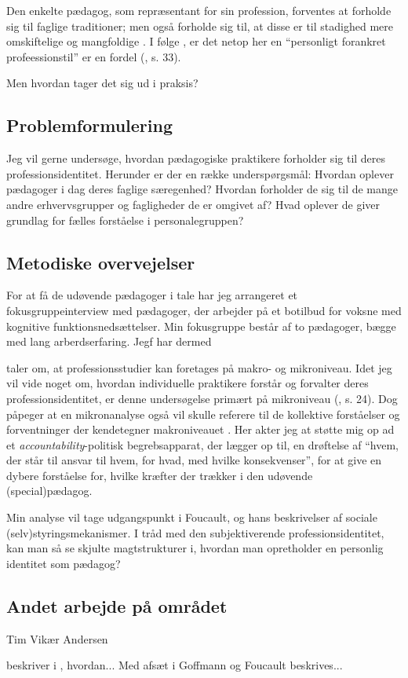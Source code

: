 Den enkelte pædagog, som repræsentant for sin profession, forventes at forholde sig til faglige traditioner; men også forholde sig til, at disse er til stadighed mere omskiftelige og mangfoldige \autocite{hansbolKonstruktionAfProfessionel2008}. I følge \citeauthor{hansbolKonstruktionAfProfessionel2008}, er det netop her en “personligt forankret profeessionstil” er en fordel (\citeyear{hansbolKonstruktionAfProfessionel2008}, s. 33).

Men hvordan tager det sig ud i praksis?

\subsection{Problemformulering}
Jeg vil gerne undersøge, hvordan pædagogiske praktikere forholder sig til deres professionsidentitet.
Herunder er der en række underspørgsmål:
Hvordan oplever pædagoger i dag deres faglige særegenhed?
Hvordan forholder de sig til de mange andre erhvervsgrupper og fagligheder de er omgivet af?
Hvad oplever de giver grundlag for fælles forståelse i personalegruppen?

\subsection{Metodiske overvejelser}

For at få de udøvende pædagoger i tale har jeg arrangeret et fokusgruppeinterview med pædagoger, der arbejder på et botilbud for voksne med kognitive funktionsnedsættelser.
Min fokusgruppe består af to pædagoger, bægge med lang arberdserfaring.
Jegf har dermed 

\citeauthor{molanderProfesjonsstudierIntroduksjon2008} taler om, at  professionsstudier kan foretages på makro- og mikroniveau.
Idet jeg vil vide noget om, hvordan individuelle praktikere forstår og forvalter deres professionsidentitet, er denne undersøgelse primært på mikroniveau (\citeyear{molanderProfesjonsstudierIntroduksjon2008}, s. 24).
Dog påpeger \citeauthor{molanderProfesjonsstudierIntroduksjon2008} at en mikronanalyse også vil skulle referere til de kollektive forståelser og forventninger der kendetegner makroniveauet \autocite[s. 24]{molanderProfesjonsstudierIntroduksjon2008}.
Her akter jeg at støtte mig op ad et \textit{accountability}-politisk begrebsapparat, der lægger op til, en drøftelse af “hvem, der står til ansvar til hvem, for hvad, med hvilke konsekvenser”, for at give en dybere forståelse for, hvilke kræfter der trækker i den udøvende (special)pædagog.

Min analyse vil tage udgangspunkt i Foucault, og hans beskrivelser af sociale (selv)styringsmekanismer. I tråd med den subjektiverende professionsidentitet, kan man så se skjulte magtstrukturer i, hvordan man opretholder en personlig identitet som pædagog?

\subsection{Andet arbejde på området}

Tim Vikær Andersen

\citeauthor{hurFrigorelsensMagt2015} beskriver i , hvordan... 
Med afsæt i Goffmann og Foucault beskrives...
